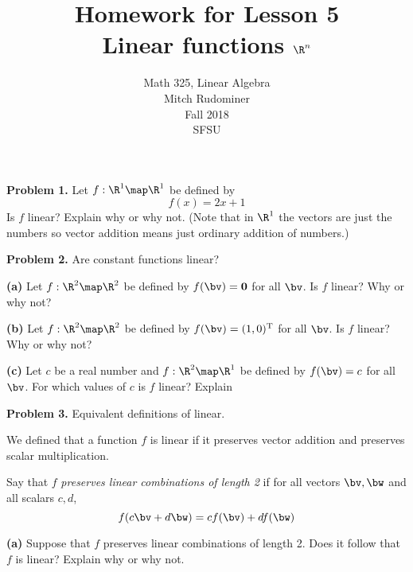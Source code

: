 \documentclass[oneside,12pt]{amsart}
\begin{document}
\title{Homework for Lesson 5 \\ Linear functions $\R^n$}
\author{Math 325, Linear Algebra \\ Mitch Rudominer \\ Fall 2018 \\ SFSU }
\date{}

\maketitle


\textbf{Problem 1.} Let $f:\R^1\map\R^1$ be defined by
$$f(x) = 2x+1$$
Is $f$ linear? Explain why or why not. (Note that in $\R^1$ the vectors are
just the numbers so vector addition means just ordinary addition of numbers.)

\bigskip
\bigskip
\bigskip
\bigskip
\bigskip
\bigskip

\textbf{Problem 2.} Are constant functions linear?

\smallskip

\textbf{(a)} Let $f:\R^{2}\map\R^2$ be defined by $f(\bv) = \textbf{0}$ for
all $\bv$. Is $f$ linear? Why or why not?

\bigskip
\bigskip
\bigskip
\bigskip
\bigskip
\bigskip

\textbf{(b)} Let $f:\R^{2}\map\R^2$ be defined by $f(\bv) = (1,0)^{\text{T}}$ for
all $\bv$. Is $f$ linear? Why or why not?

\bigskip
\bigskip
\bigskip
\bigskip
\bigskip
\bigskip

\textbf{(c)} Let $c$ be a real number and
$f:\R^{2}\map\R^1$ be defined by $f(\bv) = c$ for
all $\bv$. For which values of $c$ is $f$ linear? Explain

\bigskip
\bigskip
\bigskip
\bigskip
\bigskip
\bigskip

\textbf{Problem 3.} Equivalent definitions of linear.

\smallskip

We defined
that a function $f$ is linear if it preserves vector addition and
preserves scalar multiplication.

\smallskip

Say that $f$ \emph{preserves linear combinations of length 2}
if for all vectors $\bv, \bw$ and all scalars $c, d$,
$$f(c\bv + d\bw) = c f(\bv) + d f (\bw)$$

\bigskip

\textbf{(a)} Suppose that $f$ preserves linear combinations of length 2.
Does it follow that $f$ is linear? Explain why or why not.
\end{document}
